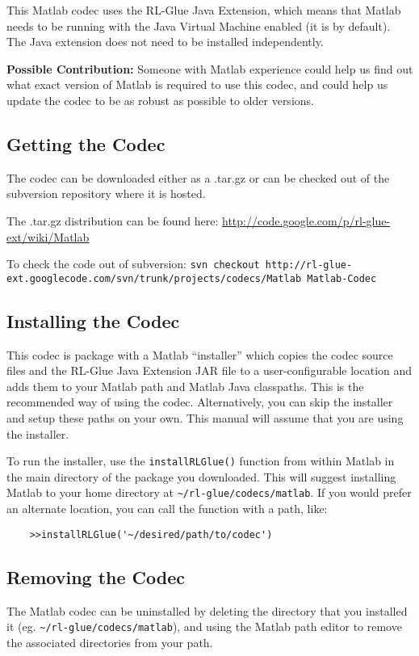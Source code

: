 \documentclass[11pt]{article}
\begin{document}
This Matlab codec uses the RL-Glue Java Extension, which means that Matlab needs to be running with the Java Virtual Machine enabled (it is by default).  The Java extension does not need to be installed independently.

\textbf{Possible Contribution: }Someone with Matlab experience could help us find out what exact version of Matlab is required to use this codec, and could help us update the codec to be as robust as possible to older versions.


\subsection{Getting the Codec}
The codec can be downloaded either as a .tar.gz or can be checked out of the subversion repository where it is hosted.

The .tar.gz distribution can be found here:\newline
\url{http://code.google.com/p/rl-glue-ext/wiki/Matlab}


To check the code out of subversion:\newline
\small \texttt{svn checkout http://rl-glue-ext.googlecode.com/svn/trunk/projects/codecs/Matlab Matlab-Codec} \normalsize

\subsection{Installing the Codec}
This codec is package with a Matlab ``installer'' which copies the codec source files and the RL-Glue Java Extension JAR file to a user-configurable location and adds them to your Matlab path and Matlab Java classpaths.  This is the recommended way of using the codec.  Alternatively, you can skip the installer and setup these paths on your own.   This manual will assume that you are using the installer.

To run the installer, use the \texttt{installRLGlue()} function from within Matlab in the main directory of the package you downloaded.  This will suggest installing Matlab to your home directory at \texttt{\~{}/rl-glue/codecs/matlab}.  If you would prefer an alternate location, you can call the function with a path, like:
\begin{verbatim}
	>>installRLGlue('~/desired/path/to/codec')
\end{verbatim}

\subsection{Removing the Codec}
The Matlab codec can be uninstalled by deleting the directory that you installed it \newline(eg. \texttt{\~{}/rl-glue/codecs/matlab}), and using the Matlab path editor to remove the associated directories from your path.
\end{document}
